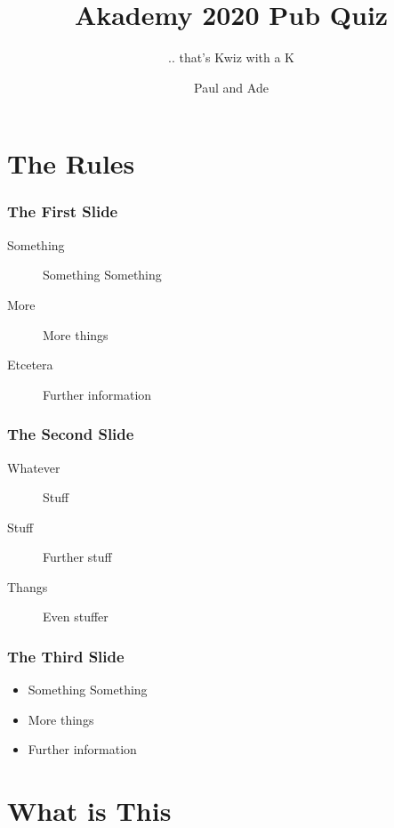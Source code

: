 \documentclass[t,compress,aspectratio=169]{beamer}
\title{Akademy 2020 Pub Quiz}
\subtitle{.. that's Kwiz with a K}
\author{Paul and Ade}
\begin{document}
\begin{withoutheadline}
\begin{frame}
\titlepage
\end{frame}
\end{withoutheadline}

\section{The Rules}

\begin{frame}
    \frametitle{The First Slide}
    \begin{description}
        \item[Something] Something Something
        \pause
        \item[More] More things
        \pause
        \item[Etcetera] Further information
    \end{description}
\end{frame}

\begin{frame}
    \frametitle{The Second Slide}
    \begin{description}
        \item[Whatever] Stuff
        \pause
        \item[Stuff] Further stuff
        \pause
        \item[Thangs] Even stuffer
    \end{description}
\end{frame}

\begin{frame}
    \frametitle{The Third Slide}
    \begin{itemize}
        \item Something Something
        \item More things
        \item Further information
    \end{itemize}
\end{frame}



\section{What is This}
\end{document}
